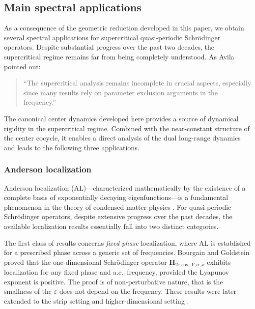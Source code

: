 \documentclass[reqno,11pt]{amsart}
\begin{document}
\subsection{Main spectral applications}

As a consequence of the geometric reduction developed in this paper, we obtain several spectral applications for supercritical quasi-periodic Schr\"odinger operators. Despite substantial progress over the past two decades, the supercritical regime remains far from being completely understood. As Avila \cite{avila-kam} pointed out:
\begin{quote}
``The supercritical analysis remains incomplete in crucial aspects, especially since many results rely on parameter exclusion arguments in the frequency.''
\end{quote}
The canonical center dynamics developed here provides a source of dynamical rigidity in the supercritical regime. Combined with the near-constant structure of the center cocycle, it enables a direct analysis of the dual long-range dynamics and leads to the following three applications.

\subsubsection{Anderson localization}
Anderson localization (AL)---characterized mathematically by the existence of a complete basis of exponentially decaying eigenfunctions---is a fundamental phenomenon in the theory of condensed matter physics \cite{anderson, ag, h}. For quasi-periodic Schr\"odinger operators, 
despite extensive progress over the past decades, the available localization results
essentially fall into two distinct categories.



The first class of results concerns \emph{fixed phase} localization, where AL is established for a prescribed phase across a generic set of frequencies. Bourgain and Goldstein \cite{BG00} proved that the one-dimensional Schr\"odinger operator $\mathbf{H}_{2 \varepsilon\cos, V, \alpha,x}$  exhibits localization for any fixed phase and a.e.\ frequency, provided the Lyapunov exponent is  positive.  The proof is of non-perturbative nature, that is  the smallness  of the $\varepsilon$ does not depend on the frequency. These results were later extended to the strip setting \cite{BJ1,HS3,Klein} and higher-dimensional setting  \cite{Bou02, Bou07,Liu, JLS}.
\end{document}
